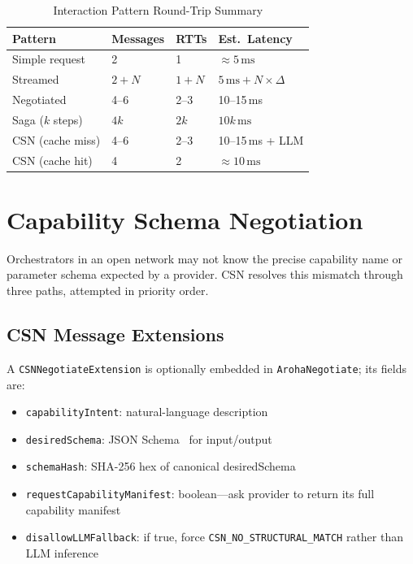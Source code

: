 \documentclass[conference]{IEEEtran}
\begin{document}
\begin{table}[t]
\centering
\caption{Interaction Pattern Round-Trip Summary}
\label{tab:rtt}
{\small
\begin{tabular}{@{}llll@{}}
\toprule
\textbf{Pattern} & \textbf{Messages} & \textbf{RTTs} & \textbf{Est.\ Latency} \\
\midrule
Simple request      & 2       & 1       & $\approx 5\,\text{ms}$ \\
Streamed            & $2+N$   & $1+N$   & $5\,\text{ms}+N{\times}\Delta$ \\
Negotiated          & 4--6    & 2--3    & 10--15\,ms \\
Saga ($k$ steps)    & $4k$    & $2k$    & $10k\,\text{ms}$ \\
CSN (cache miss)    & 4--6    & 2--3    & 10--15\,ms + LLM \\
CSN (cache hit)     & 4       & 2       & $\approx 10\,\text{ms}$ \\
\bottomrule
\end{tabular}
}
\end{table}

\section{Capability Schema Negotiation}
\label{sec:csn}

Orchestrators in an open network may not know the precise capability
name or parameter schema expected by a provider.  CSN resolves this
mismatch through three paths, attempted in priority order.

\subsection{CSN Message Extensions}

A \texttt{CSNNegotiateExtension} is optionally embedded in
\texttt{ArohaNegotiate}; its fields are:
\begin{itemize}
  \item \texttt{capabilityIntent}: natural-language description
  \item \texttt{desiredSchema}: JSON Schema~\cite{w3cjsonschema} for
        input/output
  \item \texttt{schemaHash}: SHA-256 hex of canonical desiredSchema
  \item \texttt{requestCapabilityManifest}: boolean—ask provider to
        return its full capability manifest
  \item \texttt{disallowLLMFallback}: if true, force
        \texttt{CSN\_NO\_STRUCTURAL\_MATCH} rather than LLM inference
\end{itemize}
\end{document}
